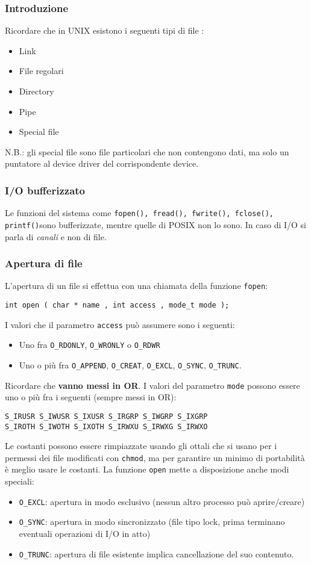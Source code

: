 \documentclass[a4paper]{article}
\begin{document}
\subsubsection{Introduzione}
Ricordare che in UNIX esistono i seguenti tipi di file :
\begin{itemize}
\item Link
\item File regolari
\item Directory
\item Pipe
\item Special file
\end{itemize}
N.B.: gli special file sono file particolari che non contengono dati, ma solo un puntatore al device driver del corrispondente device.

\subsubsection{I/O bufferizzato}
Le funzioni del sistema come 
\verb|fopen(), fread(), fwrite(), fclose(), printf()|sono bufferizzate, mentre quelle di POSIX non lo sono.
In caso di I/O si parla di \textit{canali} e non di file.
\subsubsection{Apertura di file}
L'apertura di un file si effettua con una chiamata della funzione \verb|fopen|:
\begin{verbatim}
int open ( char * name , int access , mode_t mode );
\end{verbatim}
I valori che il parametro \verb|access| può assumere sono i seguenti:
\begin{itemize}
\item Uno fra \verb|O_RDONLY|, \verb|O_WRONLY| o \verb|O_RDWR|
\item Uno o più fra \verb|O_APPEND|, \verb|O_CREAT|, \verb|O_EXCL|, \verb|O_SYNC|, \verb|O_TRUNC|.
\end{itemize}
Ricordare che \textbf{vanno messi in OR}.
I valori del parametro \verb|mode| possono essere uno o più fra i seguenti (sempre messi in OR):
\begin{verbatim}
S_IRUSR S_IWUSR S_IXUSR S_IRGRP S_IWGRP S_IXGRP
S_IROTH S_IWOTH S_IXOTH S_IRWXU S_IRWXG S_IRWXO
\end{verbatim}
Le costanti possono essere rimpiazzate usando gli ottali che si usano per i permessi dei file modificati con \verb|chmod|, ma per garantire un minimo di portabilità è meglio usare le costanti. La funzione \verb|open| mette a disposizione anche modi speciali:
\begin{itemize}
\item \verb|O_EXCL|: apertura in modo esclusivo (nessun altro processo può aprire/creare)
\item \verb|O_SYNC|: apertura in modo sincronizzato (file tipo lock, prima terminano eventuali operazioni di I/O in atto)
\item \verb|O_TRUNC|: apertura di file esistente implica cancellazione del suo contenuto.
\end{itemize}
\end{document}
